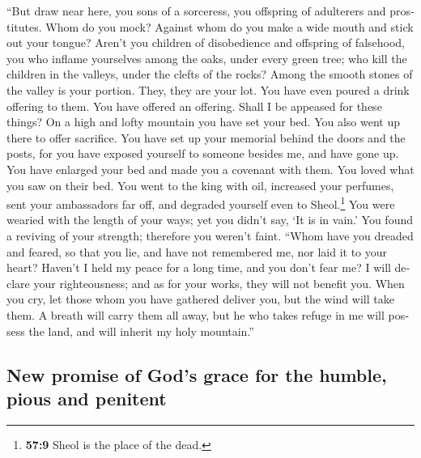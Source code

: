 \begin{paracol}{2}
\begin{otherlanguage}{english}
 ``But draw near here, you sons of a sorceress, you
offspring of adulterers and prostitutes.  Whom do you
mock? Against whom do you make a wide mouth and stick out your tongue?
Aren't you children of disobedience and offspring of falsehood,
 you who inflame yourselves among the oaks, under every
green tree; who kill the children in the valleys, under the clefts of
the rocks?  Among the smooth stones of the valley is your
portion. They, they are your lot. You have even poured a drink offering
to them. You have offered an offering. Shall I be appeased for these
things?  On a high and lofty mountain you have set your
bed. You also went up there to offer sacrifice.  You have
set up your memorial behind the doors and the posts, for you have
exposed yourself to someone besides me, and have gone up. You have
enlarged your bed and made you a covenant with them. You loved what you
saw on their bed.  You went to the king with oil,
increased your perfumes, sent your ambassadors far off, and degraded
yourself even to Sheol.\footnote{\textbf{57:9} Sheol is the place of the
  dead.}  You were wearied with the length of your ways;
yet you didn't say, `It is in vain.' You found a reviving of your
strength; therefore you weren't faint.  ``Whom have you
dreaded and feared, so that you lie, and have not remembered me, nor
laid it to your heart? Haven't I held my peace for a long time, and you
don't fear me?  I will declare your righteousness; and as
for your works, they will not benefit you.  When you cry,
let those whom you have gathered deliver you, but the wind will take
them. A breath will carry them all away, but he who takes refuge in me
will possess the land, and will inherit my holy mountain.''

\hypertarget{new-promise-of-gods-grace-for-the-humble-pious-and-penitent}{%
\subsection{New promise of God's grace for the humble, pious and
penitent}\label{new-promise-of-gods-grace-for-the-humble-pious-and-penitent}}


\end{otherlanguage}
\end{paracol}
